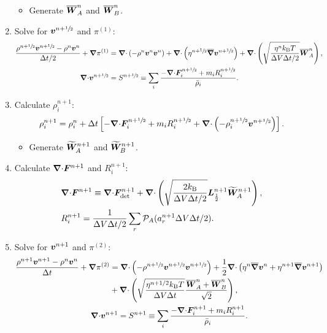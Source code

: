 \documentclass[
10pt
showpacs, showkeys,
amsmath,amssymb,
aps,
pre,
floatfix,
]{revtex4-1}
\newcommand{\divg}{{\V\nabla\cdot}}                       %
\newcommand{\paren}[1]{{(#1)}}                            %
\begin{document}
\begin{enumerate}
\begin{itemize}
\item Generate $\overline{\boldsymbol{W}}^n_A$ and $\overline{\boldsymbol{W}}^n_B$.
\end{itemize}

\item Solve for $\boldsymbol{v}^{n+\sfrac{1}{2}}$ and $\pi^\paren{1}$:
\begin{align}
\label{stokes_v_1st}
\frac{\rho^{n+\myhalf}\V{v}^{n+\myhalf}-\rho^n\V{v}^n}{\D{t}/2} + \grad\pi^\paren{1}
& = \divg\left(-\rho^n\V{v}^n\V{v}^n\right) + \divg\left( \eta^{n+\myhalf} \overline{\grad}\V{v}^{n+\myhalf} \right)
+ \divg\left( \sqrt{\frac{\eta^n k_\mathrm{B}T}{\D{V}\D{t}/2} } \overline{\V{W}}^n_A \right),
\\
\label{stokes_p_1st}
\divg\V{v}^{n+\myhalf}
& = S^{n+\myhalf}\equiv \sum_i \frac{-\divg\V{F}^{n+\myhalf}_i + m_i R^{n+\myhalf}_i }{\bar{\rho}_i}.
\end{align}

\item Calculate $\rho^{n+1}_i$:
\begin{equation}
\rho^{n+1}_i = \rho^n_i + \D{t} \left[ -\divg\V{F}^{n+\myhalf}_i + m_i R^{n+\myhalf}_i + \divg\left( -\rho^{n+\myhalf}_i \V{v}^{n+\myhalf} \right) \right].
\end{equation} 

\begin{itemize}
\item Generate $\widetilde{\boldsymbol{W}}^{n+1}_A$ and $\widetilde{\boldsymbol{W}}^{n+1}_B$.
\end{itemize}

\item Calculate $\divg\V{F}^{n+1}$ and $R^{n+1}_i$:
\begin{align}
\label{fluxdiv_2nd}
& \divg\V{F}^{n+1} \equiv \divg\V{F}_\mathrm{det}^{n+1} + \divg\left( \sqrt{ \frac{2k_\mathrm{B}}{\D{V}\D{t}/2} } \V{L}^{n+1}_{\frac12} \widetilde{\V{W}}^{n+1}_A \right), \\
\label{chemrate_2nd}
& R^{n+1}_i = \frac{1}{\D{V}\D{t}/2}\sum_r \mathcal{P}_A(a^{n+1}_r\D{V}\D{t}/2).
\end{align}

\item Solve for $\boldsymbol{v}^{n+1}$ and $\pi^\paren{2}$:
\begin{gather}
\label{stokes_v_2nd}
\begin{split}
\frac{\rho^{n+1}\V{v}^{n+1}-\rho^n\V{v}^n}{\D{t}} + \grad\pi^\paren{2}
&= \divg\left(-\rho^{n+\myhalf}\V{v}^{n+\myhalf}\V{v}^{n+\myhalf}\right) + \frac{1}{2}\divg\left( \eta^n \overline{\grad}\V{v}^n + \eta^{n+1} \overline{\grad}\V{v}^{n+1} \right) \\
&+ \divg\left( \sqrt{\frac{\eta^{n+1/2} k_\mathrm{B}T}{\D{V}\D{t}} } \frac{\overline{\V{W}}^n_A + \overline{\V{W}}^n_B}{\sqrt{2}} \right),
\end{split} \\
\label{stokes_p_2nd}
\divg\V{v}^{n+1}=S^{n+1}\equiv \sum_i \frac{-\divg\V{F}^{n+1}_i + m_i R^{n+1}_i }{\bar{\rho}_i}.
\end{gather}

\end{enumerate}
\end{document}
